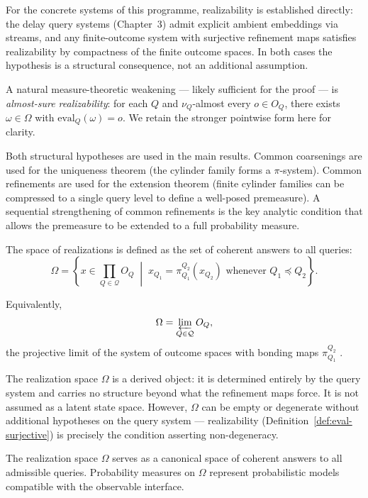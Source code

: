\begin{remark}
For the concrete systems of this programme, realizability is established directly:
the delay query systems (Chapter~3) admit explicit ambient embeddings via streams, and
any finite-outcome system with surjective refinement maps satisfies realizability by
compactness of the finite outcome spaces.  In both cases the hypothesis is a
structural consequence, not an additional assumption.

A natural measure-theoretic weakening --- likely sufficient for the
proof --- is \emph{almost-sure realizability}: for each $Q$ and
$\nu_Q$-almost every $o \in O_Q$, there exists $\omega \in \Omega$
with $\mathrm{eval}_Q(\omega) = o$. We retain the stronger pointwise
form here for clarity.
\end{remark}

Both structural hypotheses are used in the main results.
Common coarsenings are used for the uniqueness theorem
(the cylinder family forms a $\pi$-system).
Common refinements are used for the extension theorem
(finite cylinder families can be compressed to a single query level
to define a well-posed premeasure).
A sequential strengthening of common refinements is the key analytic
condition that allows the premeasure to be extended to a full
probability measure.

The space of realizations is defined as the set of coherent answers
to all queries:
\[
\Omega
=
\left\{
x \in \prod_{Q\in\mathcal Q} O_Q
\;\middle|\;
x_{Q_1}
=
\pi^{Q_2}_{Q_1}(x_{Q_2})
\text{ whenever } Q_1 \preceq Q_2
\right\}.
\]

Equivalently,
\[
\Omega = \varprojlim_{Q\in\mathcal Q} O_Q ,
\]
the projective limit of the system of outcome spaces with bonding maps
$\pi^{Q_2}_{Q_1}$ \cite{Parthasarathy}.

\begin{remark}
The realization space $\Omega$ is a derived object: it is determined
entirely by the query system and carries no structure beyond what the
refinement maps force. It is not assumed as a latent state space.
However, $\Omega$ can be empty or degenerate without additional
hypotheses on the query system --- realizability
(Definition~\ref{def:eval-surjective}) is precisely the condition
asserting non-degeneracy.
\end{remark}

The realization space $\Omega$ serves as a canonical space of coherent
answers to all admissible queries. Probability measures on $\Omega$
represent probabilistic models compatible with the observable interface.


